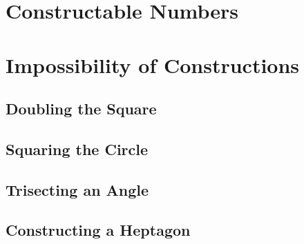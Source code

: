 \section{Constructable Numbers}

\section{Impossibility of Constructions}

\subsection{Doubling the Square}

\subsection{Squaring the Circle}

\subsection{Trisecting an Angle}

\subsection{Constructing a Heptagon}
